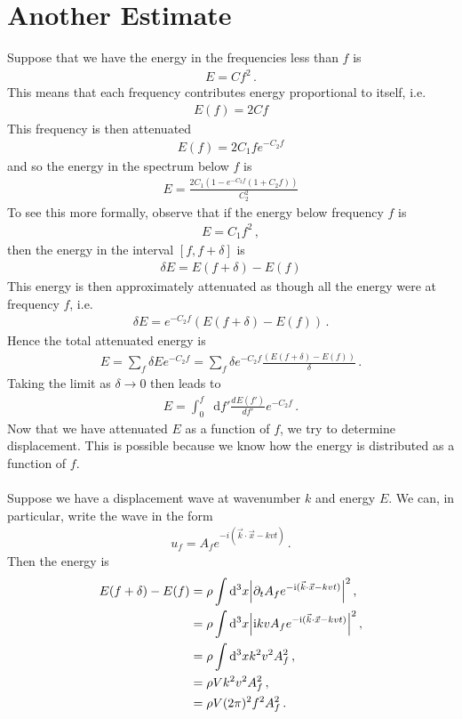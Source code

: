 \documentclass{article}
\newcommand*\diff{\mathop{}\!\mathrm{d}}
\newcommand*\te[1]{\text{#1}}
\newcommand*\f[2]{\frac{#1}{#2}}
\newcommand*\I{\te{i}}
\newcommand*\td[3]{\frac{d^{#3}#1}{d #2^{#3}}}
\begin{document}
\section{Another Estimate}
Suppose that we have the energy in the frequencies less than $f$ is
\begin{align}
E = Cf^2\,.
\end{align}
This means that each frequency contributes energy proportional to itself, i.e.
\begin{align}
E(f) = 2 Cf
\end{align}
This frequency is then attenuated
\begin{align}
E(f) =  2 C_1 f e^{- C_2 f}
\end{align}
and so the energy in the spectrum below $f$ is
\begin{align}
E = \f{2 C_1(1-e^{-C_2 f}(1+C_2 f))}{C_2^2}
\end{align}
To see this more formally, observe that if the energy below frequency $f$ is
\begin{align}
E=C_1f^2\,,
\end{align}
then the energy in the interval $[f,f+\delta]$ is
\begin{align}
\delta E = E(f+\delta)-E(f)
\end{align}
This energy is then approximately attenuated as though all the energy were at frequency $f$, i.e.
\begin{align}
\delta E = e^{-C_2f}(E(f+\delta)-E(f))\,.
\end{align}
Hence the total attenuated energy is
\begin{align}
E = \sum_f\delta Ee^{-C_2f} = \sum_f\delta e^{-C_2f}\f{(E(f+\delta)-E(f))}{\delta}\,.
\end{align}
Taking the limit as $\delta\to 0$ then leads to
\begin{align}
E = \int_0^f\diff f' \td{E(f')}{f'}{}e^{-C_2f}\,.
\end{align}
Now that we have attenuated $E$ as a function of $f$, we try to determine displacement. This is possible because we know how the energy is distributed as a function of $f$.
\\\\
Suppose we have a displacement wave at wavenumber $k$ and energy $E$. We can, in particular, write the wave in the form
\begin{align}
u_f = A_fe^{-i(\vec k\cdot \vec x - k v t)}\,.
\end{align}
Then the energy is
\begin{align}
E(f+\delta)-E(f) &= \rho\int\diff^3 x \abs{\partial_t A_fe^{-\I(\vec k\cdot \vec x - k v t)}}^2\,,\\
&= \rho\int\diff^3 x \abs{\I k v A_fe^{-\I(\vec k\cdot \vec x - k v t)}}^2\,,\\
&= \rho\int\diff^3 x  k^2 v^2 A_f^2\,,\\
&= \rho V  k^2 v^2 A_f^2\,,\\
&= \rho V  (2\pi)^2 f^2 A_f^2\,.
\end{align}
\end{document}
